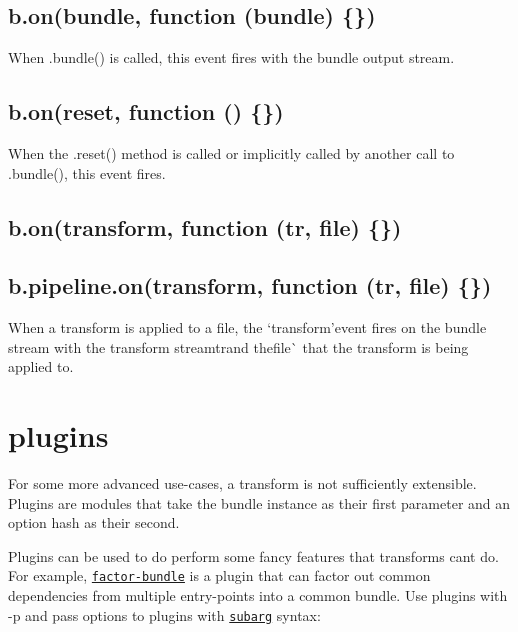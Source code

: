 \subsection*{b.\+on(\textquotesingle{}bundle\textquotesingle{}, function (bundle) \{\})}

When {\ttfamily .bundle()} is called, this event fires with the {\ttfamily bundle} output stream.

\subsection*{b.\+on(\textquotesingle{}reset\textquotesingle{}, function () \{\})}

When the {\ttfamily .reset()} method is called or implicitly called by another call to {\ttfamily .bundle()}, this event fires.

\subsection*{b.\+on(\textquotesingle{}transform\textquotesingle{}, function (tr, file) \{\})}

\subsection*{b.\+pipeline.\+on(\textquotesingle{}transform\textquotesingle{}, function (tr, file) \{\})}

When a transform is applied to a file, the `\textquotesingle{}transform'{\ttfamily event fires on the bundle stream with the transform stream}tr{\ttfamily and the}file\`{} that the transform is being applied to.

\section*{plugins}

For some more advanced use-\/cases, a transform is not sufficiently extensible. Plugins are modules that take the bundle instance as their first parameter and an option hash as their second.

Plugins can be used to do perform some fancy features that transforms can\textquotesingle{}t do. For example, \href{https://www.npmjs.com/package/factor-bundle}{\tt factor-\/bundle} is a plugin that can factor out common dependencies from multiple entry-\/points into a common bundle. Use plugins with {\ttfamily -\/p} and pass options to plugins with \href{https://www.npmjs.com/package/subarg}{\tt subarg} syntax\+:


